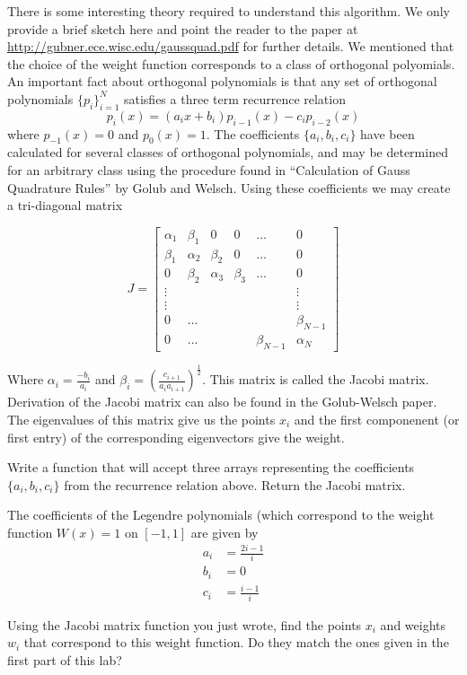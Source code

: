 There is some interesting theory required to understand this algorithm.
We only provide a brief sketch here and point the reader to the paper at \url{http://gubner.ece.wisc.edu/gaussquad.pdf} for further details.
We mentioned that the choice of the weight function corresponds to a class of orthogonal polyomials.
An important fact about orthogonal polynomials is that any set of orthogonal polynomials $\{p_i\}_{i=1}^N$ satisfies a three term recurrence relation
\[
p_i(x) = (a_ix + b_i)p_{i-1}(x) - c_ip_{i-2}(x)
\]
where $p_{-1}(x) = 0$ and $p_0(x) = 1$.
The coefficients $\{a_i, b_i, c_i\}$ have been calculated for several classes of orthogonal polynomials, and may be determined for an arbitrary class using the procedure found in ``Calculation of Gauss Quadrature Rules'' by Golub and Welsch.
Using these coefficients we may create a tri-diagonal matrix

\[
J = \begin{bmatrix}

\alpha_1 & \beta_1 & 0 & 0 & ... & 0 \\
\beta_1 & \alpha_2 & \beta_2 & 0 & ... & 0 \\
0 & \beta_2 & \alpha_3 & \beta_3 & ... & 0 \\
\vdots & & & & & \vdots \\
\vdots & & & & & \vdots \\
0 & ... & & & & \beta_{N-1} \\
0 & ... & & & \beta_{N-1} & \alpha_N

\end{bmatrix}
\]

Where $\alpha_i = \frac{-b_i}{a_i}$ and $\beta_i = (\frac{c_{i+1}}{a_ia_{i+1}})^{\frac{1}{2}}$.
This matrix is called the Jacobi matrix.
Derivation of the Jacobi matrix can also be found in the Golub-Welsch paper.
The eigenvalues of this matrix give us the points $x_i$ and the first componenent (or first entry) of the corresponding eigenvectors give the weight.

\begin{problem}
Write a function that will accept three arrays representing the coefficients $\{a_i, b_i, c_i\}$ from the recurrence relation above.
Return the Jacobi matrix.
\end{problem}

\begin{problem}
The coefficients of the Legendre polynomials (which correspond to the weight function $W(x) = 1$ on $[-1,1]$ are given by
\begin{align*}
a_i &= \frac{2i - 1}{i} \\
b_i &= 0 \\
c_i &= \frac{i-1}{i}
\end{align*}

Using the Jacobi matrix function you just wrote, find the points $x_i$ and weights $w_i$ that correspond to this weight function.
Do they match the ones given in the first part of this lab?

\end{problem}

